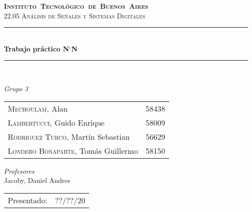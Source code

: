 \begin{titlepage}
\newcommand{\HRule}{\rule{\linewidth}{0.5mm}}
\center
\mbox{\textsc{\LARGE \bfseries {Instituto Tecnológico de Buenos Aires}}}\\[1.5cm]
\textsc{\Large 22.05 Análisis de Señales y Sistemas Digitales}\\[0.5cm]


\HRule \\[0.6cm]
{ \Huge \bfseries Trabajo práctico N$^{\circ}$N}\\[0.4cm] 
\HRule \\[1.5cm]


{\large

\emph{Grupo 3}\\
\vspace{3px}

\begin{tabular}{lr} 	
\textsc{Mechoulam}, Alan  &  58438\\
\textsc{Lambertucci}, Guido Enrique  & 58009 \\
\textsc{Rodriguez Turco}, Martín Sebastian  & 56629 \\
\textsc{Londero Bonaparte}, Tomás Guillermo  & 58150 \\
\end{tabular}

\vspace{20px}

\emph{Profesores}\\
Jacoby, Daniel Andres\\



\vspace{3px}

\vspace{100px}

\begin{tabular}{ll}

Presentado: & ??/??/20\\

\end{tabular}

}

\vfill

\end{titlepage}
